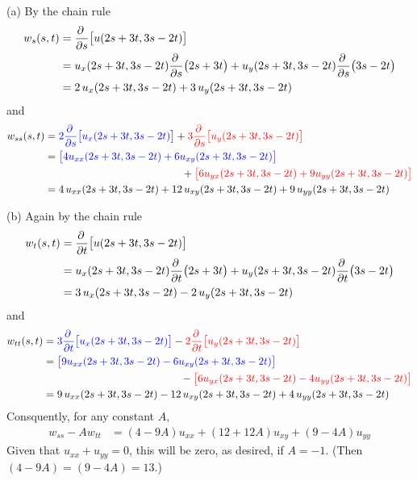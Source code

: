 \begin{solution}
(a) 
By the chain rule
\begin{align*}
w_s(s,t) &=\pdiff{}{s}\big[u(2s + 3t, 3s - 2t)\big] \\
         &= u_x(2s + 3t, 3s - 2t)\pdiff{}{s}\big(2s + 3t\big)
           +u_y(2s + 3t, 3s - 2t)\pdiff{}{s}\big(3s - 2t\big) \\
         &= 2\,u_x(2s + 3t, 3s - 2t) +3\,u_y(2s + 3t, 3s - 2t)
\end{align*}
and
\begin{align*}
w_{ss}(s,t) &=\textcolor{blue}{2\pdiff{}{s}\big[u_x(2s + 3t, 3s - 2t)\big]}
            + \textcolor{red}{3\pdiff{}{s}\big[u_y(2s + 3t, 3s - 2t)\big]} \\
&=\textcolor{blue}{\big[4u_{xx}(2s + 3t, 3s - 2t) 
     +6u_{xy}(2s + 3t, 3s - 2t) \big]} \\&\hskip1.8in
  +\textcolor{red}{\big[6u_{yx}(2s + 3t, 3s - 2t) 
     +9u_{yy}(2s + 3t, 3s - 2t) \big]} \\
&=4\,u_{xx}(2s + 3t, 3s - 2t) 
     +12\,u_{xy}(2s + 3t, 3s - 2t) 
     +9\,u_{yy}(2s + 3t, 3s - 2t) 
\end{align*}


(b)
Again by the chain rule
\begin{align*}
w_t(s,t) &=\pdiff{}{t}\big[u(2s + 3t, 3s - 2t)\big] \\
         &= u_x(2s + 3t, 3s - 2t)\pdiff{}{t}\big(2s + 3t\big)
           +u_y(2s + 3t, 3s - 2t)\pdiff{}{t}\big(3s - 2t\big) \\
         &= 3\,u_x(2s + 3t, 3s - 2t) -2\, u_y(2s + 3t, 3s - 2t)
\end{align*}
and
\begin{align*}
w_{tt}(s,t) &=\textcolor{blue}{3\pdiff{}{t}\big[u_x(2s + 3t, 3s - 2t)\big]}
             -\textcolor{red}{2\pdiff{}{t}\big[u_y(2s + 3t, 3s - 2t)\big]} \\
&=\textcolor{blue}{\big[9u_{xx}(2s + 3t, 3s - 2t) 
     -6u_{xy}(2s + 3t, 3s - 2t) \big]} \\&\hskip1.8in
  -\textcolor{red}{\big[6u_{yx}(2s + 3t, 3s - 2t) 
     -4u_{yy}(2s + 3t, 3s - 2t) \big]} \\
&=9\,u_{xx}(2s + 3t, 3s - 2t) 
     -12\,u_{xy}(2s + 3t, 3s - 2t) 
     +4\,u_{yy}(2s + 3t, 3s - 2t) 
\end{align*}
Consquently, for any constant $A$,
\begin{align*}
w_{ss} - Aw_{tt}
&= (4-9A) u_{xx}   +(12+12A) u_{xy} + (9-4A) u_{yy} 
\end{align*}
Given that $u_{xx} + u_{yy}=0$, this will be zero, as desired,
if $A=-1$. (Then $(4-9A)=(9-4A)=13$.)
\end{solution}

